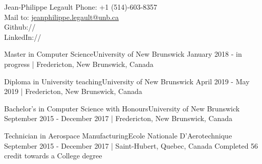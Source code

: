 \documentclass[english,letterpaper,12pt]{deedy-resume-openfont}
\begin{document}
\justify

\namesection
{Jean-Philippe}
{Legault}
{%
    Phone: +1 (514)-603-8357\\
    Mail to: \href{mailto:jeanphilippe.legault@unb.ca}{jeanphilippe.legault@unb.ca}\\
    Github://\href{https://github.com/jeanlego}{}\\
    LinkedIn://\href{https://www.linkedin.com/in/jean-philippe-legault-1489ab173}{}\\
}

%

    \employement%
        {Master in Computer Science}{University of New Brunswick}
        {January 2018 - in progress | Fredericton, New Brunswick, Canada}{%
        }

    \employement%
        {Diploma in University teaching}{University of New Brunswick}
        {April 2019 - May 2019 | Fredericton, New Brunswick, Canada}{%
        }

    \employement%
        {Bachelor's in Computer Science with Honours}{University of New Brunswick}
        {September 2015 - December 2017 | Fredericton, New Brunswick, Canada}{%
        }

    \employement%
        {Technician in Aerospace Manufacturing}{Ecole Nationale D'Aerotechnique}
        {September 2015 - December 2017 | Saint-Hubert, Quebec, Canada}{%
        Completed 56 credit towards a College degree
        }





\end{document}

